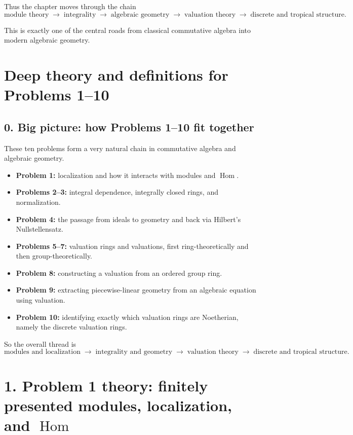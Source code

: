 \documentclass[12pt,a4paper]{article}
\theoremstyle{plain}
\theoremstyle{definition}      %
\begin{document}
Thus the chapter moves through the chain
\[
\text{module theory}
\;\to\;
\text{integrality}
\;\to\;
\text{algebraic geometry}
\;\to\;
\text{valuation theory}
\;\to\;
\text{discrete and tropical structure}.
\]

This is exactly one of the central roads from classical commutative algebra into modern algebraic geometry.\section*{Deep theory and definitions for Problems 1--10}

\subsection*{0. Big picture: how Problems 1--10 fit together}

These ten problems form a very natural chain in commutative algebra and algebraic geometry.

\begin{itemize}
	\item \textbf{Problem 1:} localization and how it interacts with modules and \(\operatorname{Hom}\).
	\item \textbf{Problems 2--3:} integral dependence, integrally closed rings, and normalization.
	\item \textbf{Problem 4:} the passage from ideals to geometry and back via Hilbert's Nullstellensatz.
	\item \textbf{Problems 5--7:} valuation rings and valuations, first ring-theoretically and then group-theoretically.
	\item \textbf{Problem 8:} constructing a valuation from an ordered group ring.
	\item \textbf{Problem 9:} extracting piecewise-linear geometry from an algebraic equation using valuation.
	\item \textbf{Problem 10:} identifying exactly which valuation rings are Noetherian, namely the discrete valuation rings.
\end{itemize}

So the overall thread is
\[
\text{modules and localization}
\;\longrightarrow\;
\text{integrality and geometry}
\;\longrightarrow\;
\text{valuation theory}
\;\longrightarrow\;
\text{discrete and tropical structure}.
\]

\bigskip

\section*{1. Problem 1 theory: finitely presented modules, localization, and \texorpdfstring{$\operatorname{Hom}$}{Hom}}
\end{document}

